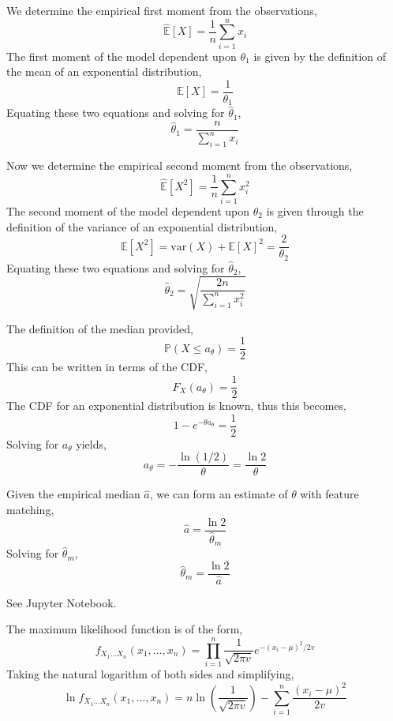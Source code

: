 \documentclass[12pt,twoside]{article}
\begin{document}
\begin{problems}
\begin{problemparts}
\problempart %
We determine the empirical first moment from the observations,
$$ \hat{\mathbb{E}}[X] = \frac{1}{n} \sum_{i = 1}^n x_i $$
The first moment of the model dependent upon $\theta_1$ is given by the
definition of the mean of an exponential distribution,
$$ \mathbb{E}[X] = \frac{1}{\theta_1} $$
Equating these two equations and solving for $\hat{\theta}_1$,
$$ \hat{\theta}_1 = \frac{n}{\sum_{i = 1}^n x_i} $$

Now we determine the empirical second moment from the observations,
$$ \hat{\mathbb{E}}[X^2] = \frac{1}{n} \sum_{i = 1}^n x_i^2 $$
The second moment of the model dependent upon $\theta_2$ is given through the
definition of the variance of an exponential distribution,
$$ \mathbb{E}[X^2] = \mathrm{var}(X) + \mathbb{E}[X]^2 = \frac{2}{\theta_2} $$
Equating these two equations and solving for $\hat{\theta}_2$,
$$ \hat{\theta}_2 = \sqrt{\frac{2n}{\sum_{i = 1}^n x_i^2}} $$

\problempart %
The definition of the median provided,
$$ \mathbb{P}(X \leq a_\theta) = \frac{1}{2} $$
This can be written in terms of the CDF,
$$ F_X(a_\theta) = \frac{1}{2} $$ 
The CDF for an exponential distribution is known, thus this becomes,
$$ 1 - e^{-\theta a_\theta} = \frac{1}{2} $$
Solving for $a_\theta$ yields,
$$ a_\theta = -\frac{\ln(1/2)}{\theta} = \frac{\ln 2}{\theta} $$

Given the empirical median $\hat{a}$, we can form an estimate of $\theta$ with
feature matching,
$$ \hat{a} = \frac{\ln 2}{\hat{\theta}_m} $$
Solving for $\hat{\theta}_m$,
$$ \hat{\theta}_m = \frac{\ln 2}{\hat{a}} $$

\problempart %

See Jupyter Notebook.

\end{problemparts}

\newpage
\problem  %

\begin{problemparts}

\problempart %
The maximum likelihood function is of the form,
$$ f_{X_1\ldots X_n}(x_1, \ldots, x_n) = \prod_{i = 1}^n \frac{1}{\sqrt{2 \pi 
v}} e^{-(x_i - \mu)^2 / 2v} $$
Taking the natural logarithm of both sides and simplifying,
$$ \ln f_{X_1\ldots X_n}(x_1, \ldots, x_n) = n \ln \left(\frac{1}{\sqrt{2 \pi 
v}}\right) - \sum_{i = 1}^n \frac{(x_i - \mu)^2}{2v} $$


\end{problemparts}
\end{problems}
\end{document}
